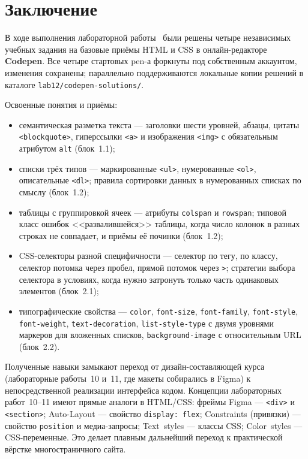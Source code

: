 \chapter*{Заключение}
\label{ch:conclusion}

В ходе выполнения лабораторной работы~\cfgLabNumber{} были решены
четыре независимых учебных задания на базовые приёмы HTML и CSS в
онлайн-редакторе \textbf{Codepen}. Все четыре стартовых pen-а
форкнуты под собственным аккаунтом, изменения сохранены; параллельно
поддерживаются локальные копии решений в каталоге
\texttt{lab12/codepen-solutions/}.

Освоенные понятия и приёмы:
\begin{itemize}
  \item семантическая разметка текста --- заголовки шести уровней,
        абзацы, цитаты \texttt{<blockquote>}, гиперссылки
        \texttt{<a>} и изображения \texttt{<img>} с обязательным
        атрибутом \texttt{alt} (блок~1.1);
  \item списки трёх типов --- маркированные \texttt{<ul>},
        нумерованные \texttt{<ol>}, описательные \texttt{<dl>};
        правила сортировки данных в нумерованных списках по
        смыслу (блок~1.2);
  \item таблицы с группировкой ячеек --- атрибуты \texttt{colspan}
        и \texttt{rowspan}; типовой класс ошибок <<развалившейся>>
        таблицы, когда число колонок в разных строках не совпадает,
        и приёмы её починки (блок~1.2);
  \item CSS-селекторы разной специфичности --- селектор по тегу,
        по классу, селектор потомка через пробел, прямой потомок
        через \texttt{>}; стратегии выбора селектора в условиях,
        когда нужно затронуть только часть одинаковых элементов
        (блок~2.1);
  \item типографические свойства --- \texttt{color},
        \texttt{font-size}, \texttt{font-family},
        \texttt{font-style}, \texttt{font-weight},
        \texttt{text-decoration}, \texttt{list-style-type}
        с двумя уровнями маркеров для вложенных списков,
        \texttt{background-image} с относительным URL (блок~2.2).
\end{itemize}

Полученные навыки замыкают переход от дизайн-составляющей курса
(лабораторные работы~10 и~11, где макеты собирались в Figma) к
непосредственной реализации интерфейса кодом. Концепции лабораторных
работ~10--11 имеют прямые аналоги в HTML/CSS: фреймы Figma ---
\texttt{<div>} и \texttt{<section>}; Auto-Layout --- свойство
\texttt{display:~flex}; Constraints (привязки) --- свойство
\texttt{position} и медиа-запросы; Text~styles --- классы CSS;
Color~styles --- CSS-переменные. Это делает плавным дальнейший
переход к практической вёрстке многостраничного сайта.

\endinput
